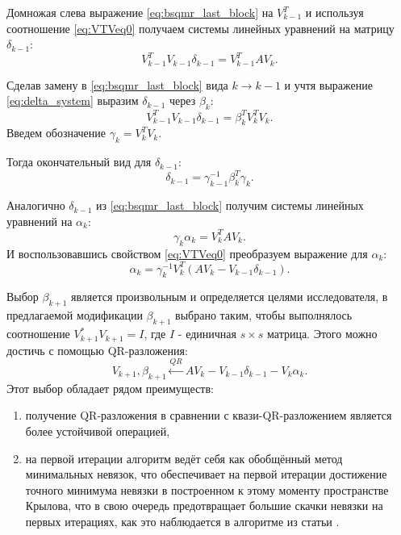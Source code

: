 Домножая слева выражение \eqref{eq:bsqmr_last_block} на $V_{k-1}^T$ и используя соотношение
\eqref{eq:VTVeq0} получаем системы линейных уравнений на матрицу $\delta_{k-1}$:
\begin{equation}
    \label{eq:delta_system}
    V_{k-1}^T V_{k-1} \delta_{k-1} = V_{k-1}^T A V_k.
\end{equation}

Сделав замену в \eqref{eq:bsqmr_last_block} вида $k \rightarrow k-1$ и учтя выражение 
\eqref{eq:delta_system} выразим $\delta_{k-1}$ через $\beta_k$:
\begin{equation*}
    V_{k-1}^T V_{k-1} \delta_{k-1} = \beta_{k}^T V_k^T V_k.
\end{equation*}
Введем обозначение $\gamma_k = V_k^T V_k$.

Тогда окончательный вид для $\delta_{k-1}$:
\begin{equation}
    \label{eq:delta_final}
    \delta_{k-1} = \gamma_{k-1}^{-1} \beta_k^T \gamma_k.
\end{equation}

Аналогично $\delta_{k-1}$ из \eqref{eq:bsqmr_last_block} получим системы линейных
уравнений на $\alpha_k$:
\begin{equation*}
    \gamma_k \alpha_k = V_k^T A V_k.
\end{equation*}
И воспользовавшись свойством \eqref{eq:VTVeq0} преобразуем выражение для $\alpha_k$:
\begin{equation}
    \alpha_k = \gamma_k^{-1} V_k^T (A V_k - V_{k-1} \delta_{k-1}).
\end{equation}

Выбор $\beta_{k+1}$ является произвольным и определяется целями исследователя, в 
предлагаемой модификации $\beta_{k+1}$ выбрано таким, чтобы выполнялось соотношение
$V_{k+1}^* V_{k+1} = I$, где $I$ - единичная $s \times s$ матрица. Этого можно достичь с помощью QR-разложения:
\begin{equation}
    V_{k+1}, \beta_{k+1} \xleftarrow{QR} A V_k - V_{k-1} \delta_{k-1} - V_k \alpha_k. 
\end{equation} 
Этот выбор обладает рядом преимуществ: \begin{enumerate}
    \item получение QR-разложения в сравнении с квази-QR-разложением является более устойчивой операцией, 
    \item на первой итерации алгоритм ведёт себя как обобщённый метод минимальных невязок, что обеспечивает на первой итерации достижение точного минимума невязки в построенном к этому моменту пространстве Крылова, что в свою очередь предотвращает большие скачки невязки на первых итерациях, как это наблюдается в алгоритме из статьи \cite{doi:10.1137/0917019}.
\end{enumerate}  

